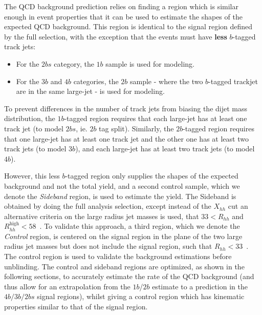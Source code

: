 The QCD background prediction relies on finding a region which is similar enough in event properties that it can be used to estimate the shapes of the expected QCD background.  This region is identical to the signal region defined by the full selection, with the exception that the events must have \textbf{less} $b$-tagged track jets:
\begin{itemize}
\item For the $2bs$ category, the $1b$ sample is used for modeling.
\item For the $3b$ and $4b$ categories, the $2b$ sample - where the two $b$-tagged trackjet are in the same large-\R jet - is used for modeling.
\end{itemize}
To prevent differences in the number of track jets from biasing the dijet mass distribution, the $1b$-tagged region requires that each large-\R jet has at least one track jet (to model $2bs$, ie. $2b$ tag split). Similarly, the $2b$-tagged region requires that one large-\R jet has at least one track jet and the other one has at least two track jets (to model $3b$), and each large-\R jet has at least two track jets (to model $4b$).

However, this less $b$-tagged region only supplies the shapes of the expected background and not the total yield, and a second control sample, which we denote the \textit{Sideband} region, is used to estimate the yield. The Sideband is obtained by doing the full analysis selection, except instead of the $X_{hh}$ cut an alternative criteria on the large radius jet masses is used, that $33 < R_{hh} $ and $R_{hh}^{\text{high}} < 58$~\GeV. To validate this approach, a third region, which we denote the \textit{Control} region, is centered on the signal region in the plane of the two large radius jet masses but does not include the signal region, such that $R_{hh} < 33$~\GeV.  The control region is used to validate the background estimations before unblinding. The control and sideband regions are optimized, as shown in the following sections, to accurately estimate the rate of the QCD background (and thus allow for an extrapolation from the $1b$/$2b$ estimate to a prediction in the $4b/3b/2bs$  signal regions), whilst giving a control region which has kinematic properties similar to that of the signal region. 







